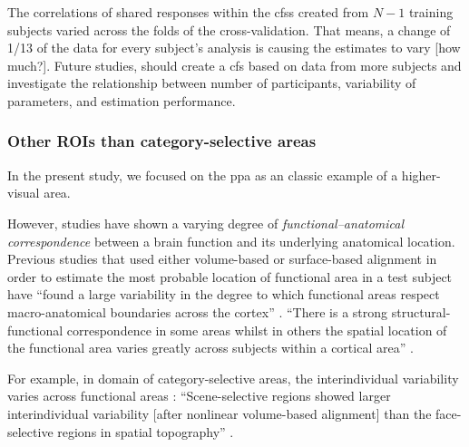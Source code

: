 
The correlations of shared responses within the \acp{cfs} created from $N-1$
training subjects varied across the folds of the cross-validation.
That means, a change of 1/13 of the data for every subject's analysis is causing
the estimates to vary [how much?].
Future studies, should create a \ac{cfs} based on data from more subjects and
investigate the relationship between number of participants, variability of
parameters, and estimation performance.



\subsubsection{Other ROIs than category-selective areas}




%
In the present study, we focused on the \ac{ppa} as an classic example of a
higher-visual area.

%
However, studies have shown a varying degree of \textit{functional--anatomical
correspondence} between a brain function and its underlying anatomical location.
%
Previous studies that used either volume-based \citep{zhen2017quantifying,
zhen2015quantifying} or surface-based alignment \citep{rosenke2021probabilistic,
frost2012measuring} in order to estimate the most probable location of
functional area in a test subject have ``found a large variability in the degree
to which functional areas respect macro-anatomical boundaries across the
cortex'' \citep{frost2012measuring}.
%
``There is a strong structural-functional correspondence in some areas whilst in
others the spatial location of the functional area varies greatly across
subjects within a cortical area'' \citep{frost2012measuring}.

%
For example, in domain of category-selective areas, the interindividual
variability varies across functional areas \citep{zhen2017quantifying,
zhen2015quantifying, frost2012measuring}:
%
``Scene-selective regions showed larger interindividual variability [after
nonlinear volume-based alignment] than the face-selective regions in spatial
topography'' \citep{zhen2017quantifying}.




